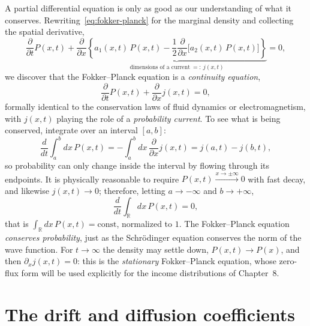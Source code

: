 A partial differential equation is only as good as our understanding of what it conserves.
Rewriting~\eqref{eq:fokker-planck} for the marginal density and collecting the spatial derivative,
\begin{equation}
\frac{\partial}{\partial t}P(x,t) + \frac{\partial}{\partial x}\underbrace{\left\{a_1(x,t)\,P(x,t) - \frac{1}{2}\frac{\partial}{\partial x}\big[a_2(x,t)\,P(x,t)\big]\right\}}_{\text{dimensions of a current}\ =:\ j(x,t)} = 0,
\end{equation}
we discover that the Fokker--Planck equation is a \emph{continuity equation},
\begin{equation}
\frac{\partial}{\partial t}P(x,t) + \frac{\partial}{\partial x}j(x,t) = 0,
\end{equation}
formally identical to the conservation laws of fluid dynamics or electromagnetism, with $j(x,t)$ playing the role of a \emph{probability current}.
To see what is being conserved, integrate over an interval $[a,b]$:
\begin{equation}
\frac{d}{dt}\int_a^b dx\, P(x,t) = -\int_a^b dx\, \frac{\partial}{\partial x}j(x,t) = j(a,t)-j(b,t),
\end{equation}
so probability can only change inside the interval by flowing through its endpoints.
It is physically reasonable to require $P(x,t)\xrightarrow{x\to\pm\infty}0$ with fast decay, and likewise $j(x,t)\to0$; therefore, letting $a\to-\infty$ and $b\to+\infty$,
\begin{equation}
\frac{d}{dt}\int_{\mathbb{R}} dx\, P(x,t) = 0,
\end{equation}
that is $\int_{\mathbb{R}} dx\, P(x,t) = \text{const}$, normalized to $1$.
The Fokker--Planck equation \emph{conserves probability}, just as the Schr\"odinger equation conserves the norm of the wave function.
For $t\to\infty$ the density may settle down, $P(x,t)\to P(x)$, and then $\partial_x j(x,t)=0$: this is the \emph{stationary} Fokker--Planck equation, whose zero-flux form will be used explicitly for the income distributions of Chapter~8.


\section{The drift and diffusion coefficients}
\label{sec:drift-diffusion}

